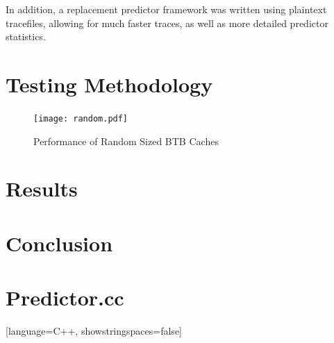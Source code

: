\documentclass[twocolumn]{article}
\newcommand{\centerimage}[3]{
\begin{figure}[ht!]  
\begin{center}
#1
\caption{#2}
\label{#3}
\end{center}
\end{figure}}
\begin{document}
In addition, a replacement predictor framework was written using
plaintext tracefiles, allowing for much faster traces, as well as more
detailed predictor statistics.

\section{Testing Methodology}
\centerimage{\texttt{[image: random.pdf]}}{Performance of Random Sized BTB Caches}{bgraph}
\section{Results}
\section{Conclusion}
\newpage
\onecolumn
\section{Predictor.cc}
[language=C++, showstringspaces=false]
\end{document}
